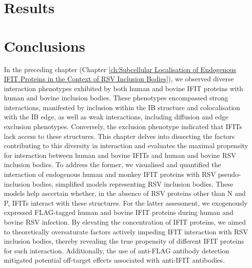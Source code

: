 \section{Results} \label{sec:Results-Chapter4}



\section{Conclusions} \label{sec:Conclusions-Chapter4}
In the preceding chapter (Chapter \ref{ch:Subcellular Localisation of Endogenous IFIT Proteins in the Context of RSV Inclusion Bodies}), we observed diverse interaction phenotypes exhibited by both human and bovine IFIT proteins with human and bovine inclusion bodies. These phenotypes encompassed strong interactions, manifested by inclusion within the IB structure and colocalisation with the IB edge, as well as weak interactions, including diffusion and edge exclusion phenotypes. Conversely, the exclusion phenotype indicated that IFITs lack access to these structures. This chapter delves into dissecting the factors contributing to this diversity in interaction and evaluates the maximal propensity for interaction between human and bovine IFITs and human and bovine RSV inclusion bodies. To address the former, we visualised and quantified the interaction of endogenous human and monkey IFIT proteins with RSV pseudo-inclusion bodies, simplified models representing RSV inclusion bodies. These models help ascertain whether, in the absence of RSV proteins other than N and P, IFITs interact with these structures. For the latter assessment, we exogenously expressed FLAG-tagged human and bovine IFIT proteins during human and bovine RSV infection. By elevating the concentration of IFIT proteins, we aimed to theoretically oversaturate factors actively impeding IFIT interaction with RSV inclusion bodies, thereby revealing the true propensity of different IFIT proteins for such interaction. Additionally, the use of anti-FLAG antibody detection mitigated potential off-target effects associated with anti-IFIT antibodies.

